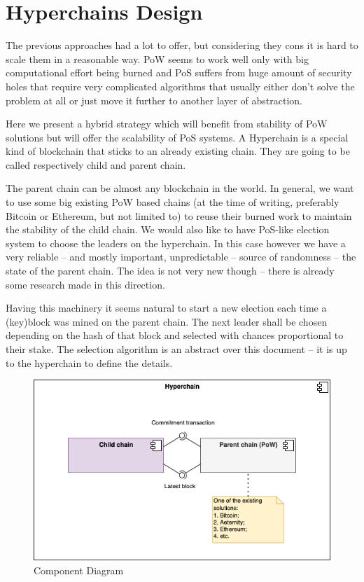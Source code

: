 \section{Hyperchains Design}
\graphicspath{ {./images/} }

The previous approaches had a lot to offer, but considering they cons it is hard
to scale them in a reasonable way. PoW seems to work well only with big
computational effort being burned and PoS suffers from huge amount of security
holes that require very complicated algorithms that usually either don't solve
the problem at all or just move it further to another layer of abstraction.

Here we present a hybrid strategy which will benefit from stability of PoW
solutions but will offer the scalability of PoS systems. A Hyperchain is a
special kind of blockchain that sticks to an already existing chain. They are
going to be called respectively child and parent chain\cite{hyperchains}.

The parent chain can be almost any blockchain in the world. In general, we want
to use some big existing PoW based chains (at the time of writing, preferably
Bitcoin or Ethereum, but not limited to) to reuse their burned work to maintain
the stability of the child chain. We would also like to have
PoS-like election system to choose the leaders on the hyperchain. In this case
however we have a very reliable – and mostly important, unpredictable – source
of randomness – the state of the parent chain. The idea is not very new
though – there is already some research made in this direction\cite{blockchain_random}.

Having this machinery it seems natural to start a new election each time a
(key)block was mined on the parent chain. The next leader shall be chosen
depending on the hash of that block and selected with chances proportional to
their stake. The selection algorithm is an abstract over this document – it is
up to the hyperchain to define the details.

\begin{figure}[h]
	\caption{Component Diagram}
	\centering
	\includegraphics[scale=0.5]{hyperchain_component}
\end{figure}

